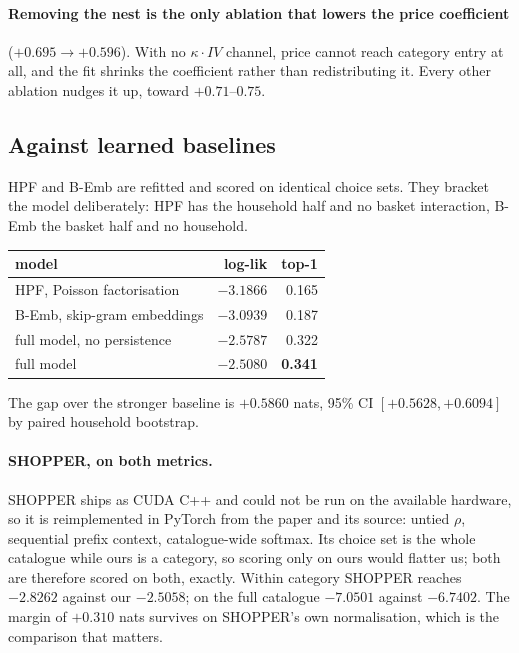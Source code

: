 \documentclass[11pt]{article}
\begin{document}
\paragraph{Removing the nest is the only ablation that lowers the price coefficient}
($+0.695\to+0.596$). With no $\kappa\cdot IV$ channel, price cannot reach category entry at
all, and the fit shrinks the coefficient rather than redistributing it. Every other ablation
nudges it up, toward $+0.71$--$0.75$.

\subsection{Against learned baselines}
\label{sec:strong}

HPF and B-Emb are refitted and scored on identical choice sets. They bracket the model
deliberately: HPF has the household half and no basket interaction, B-Emb the basket half
and no household.

\begin{center}
\begin{tabular}{lrr}
\toprule
model & log-lik & top-1 \\
\midrule
HPF, Poisson factorisation & $-3.1866$ & 0.165 \\
B-Emb, skip-gram embeddings & $-3.0939$ & 0.187 \\
full model, no persistence & $-2.5787$ & 0.322 \\
full model & $\mathbf{-2.5080}$ & \textbf{0.341} \\
\bottomrule
\end{tabular}
\end{center}

The gap over the stronger baseline is $+0.5860$ nats, 95\% CI $[+0.5628,+0.6094]$ by paired
household bootstrap.

\paragraph{SHOPPER, on both metrics.} SHOPPER ships as CUDA C++ and could not be run on the
available hardware, so it is reimplemented in PyTorch from the paper and its source: untied
$\rho$, sequential prefix context, catalogue-wide softmax. Its choice set is the whole
catalogue while ours is a category, so scoring only on ours would flatter us; both are
therefore scored on both, exactly. Within category SHOPPER reaches $-2.8262$ against our
$\mathbf{-2.5058}$; on the full catalogue $-7.0501$ against $\mathbf{-6.7402}$. The margin of
$+0.310$ nats survives on SHOPPER's own normalisation, which is the comparison that matters.
\end{document}
